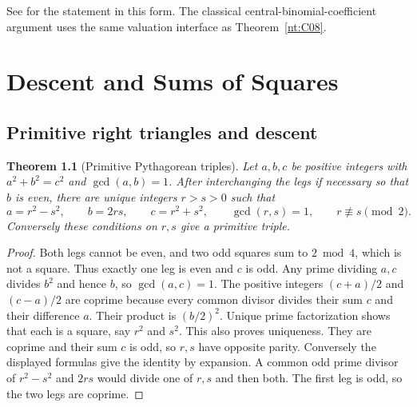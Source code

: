 \documentclass[11pt,oneside,openany]{book}
\theoremstyle{plain}
\newtheorem{theorem}{Theorem}[chapter]
\theoremstyle{definition}
\theoremstyle{remark}
\begin{document}
See \cite[Section 8.1, Theorem 8.7]{nzm} for the statement in this
form. The classical central-binomial-coefficient argument uses the
same valuation interface as Theorem~\ref{nt:C08}.
\chapter{Descent and Sums of Squares}
\label{ch:nt-diophantine}

\section{Primitive right triangles and descent}

\begin{theorem}[Primitive Pythagorean triples]\label{nt:D01}
Let \(a,b,c\) be positive integers with \(a^2+b^2=c^2\) and
\(\gcd(a,b)=1\). After interchanging the legs if necessary so that \(b\)
is even, there are unique integers \(r>s>0\) such that
\[
 a=r^2-s^2,\qquad b=2rs,\qquad c=r^2+s^2,\qquad
 \gcd(r,s)=1,\qquad r\not\equiv s\pmod 2.
\]
Conversely these conditions on \(r,s\) give a primitive triple.
\end{theorem}
\begin{proof}
Both legs cannot be even, and two odd squares sum to \(2\bmod4\),
which is not a square. Thus exactly one leg is even and \(c\) is odd.
Any prime dividing \(a,c\) divides \(b^2\) and hence \(b\), so
\(\gcd(a,c)=1\). The positive integers \((c+a)/2\) and \((c-a)/2\)
are coprime because every common divisor divides their sum \(c\)
and their difference \(a\). Their product is \((b/2)^2\).
Unique prime factorization shows that each is a square, say \(r^2\)
and \(s^2\). This also proves uniqueness. They are coprime and their
sum \(c\) is odd, so \(r,s\) have opposite parity.
Conversely the displayed formulas give the identity by expansion.
A common odd prime divisor of \(r^2-s^2\) and \(2rs\) would divide
one of \(r,s\) and then both. The first leg is odd, so the two legs
are coprime.
\end{proof}
\end{document}
